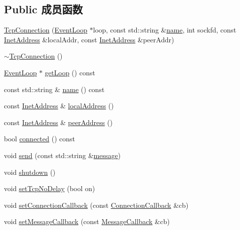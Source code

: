 \subsection*{Public 成员函数}
\begin{DoxyCompactItemize}
\item 
\hyperlink{classmuduo_1_1TcpConnection_a239881b2e3d5499da8745fba1bd82e08}{Tcp\+Connection} (\hyperlink{classmuduo_1_1EventLoop}{Event\+Loop} $\ast$loop, const std\+::string \&\hyperlink{classmuduo_1_1TcpConnection_ad8227ba86a01f26e4f173cd5e219d5d1}{name}, int sockfd, const \hyperlink{classmuduo_1_1InetAddress}{Inet\+Address} \&local\+Addr, const \hyperlink{classmuduo_1_1InetAddress}{Inet\+Address} \&peer\+Addr)
\item 
\hyperlink{classmuduo_1_1TcpConnection_a0a3551d2f9a37ccec8f9cb913e73878a}{$\sim$\+Tcp\+Connection} ()
\item 
\hyperlink{classmuduo_1_1EventLoop}{Event\+Loop} $\ast$ \hyperlink{classmuduo_1_1TcpConnection_aef1cbfe0592e8196e6c81b4db82a39ce}{get\+Loop} () const
\item 
const std\+::string \& \hyperlink{classmuduo_1_1TcpConnection_ad8227ba86a01f26e4f173cd5e219d5d1}{name} () const
\item 
const \hyperlink{classmuduo_1_1InetAddress}{Inet\+Address} \& \hyperlink{classmuduo_1_1TcpConnection_a607d0ab4bcee1d11f7de70501abdcc4b}{local\+Address} ()
\item 
const \hyperlink{classmuduo_1_1InetAddress}{Inet\+Address} \& \hyperlink{classmuduo_1_1TcpConnection_a3441a3efe8170b4b9892f0ca65d21726}{peer\+Address} ()
\item 
bool \hyperlink{classmuduo_1_1TcpConnection_aa0fd96bc25e3d509fb54028c2e4b91f6}{connected} () const
\item 
void \hyperlink{classmuduo_1_1TcpConnection_a4d274fdc2a242187da42dcd82cd593ec}{send} (const std\+::string \&\hyperlink{test13_8cc_a36bd74109f547f7f8198faf5a12d2879}{message})
\item 
void \hyperlink{classmuduo_1_1TcpConnection_a7861ee1569802186a619778efc85af13}{shutdown} ()
\item 
void \hyperlink{classmuduo_1_1TcpConnection_a7419d5072b837a2ba3cc5aac85015212}{set\+Tcp\+No\+Delay} (bool on)
\item 
void \hyperlink{classmuduo_1_1TcpConnection_abbb0008856a8495adb08c8cb7fe65c2c}{set\+Connection\+Callback} (const \hyperlink{namespacemuduo_ac7f7b0c9c9e96123dfea3fe120a2c404}{Connection\+Callback} \&cb)
\item 
void \hyperlink{classmuduo_1_1TcpConnection_a0a67f11f92b4cdc6f6c66b861f81cb08}{set\+Message\+Callback} (const \hyperlink{namespacemuduo_ab8a96fa483cffe150618e01058e6fc1b}{Message\+Callback} \&cb)

\end{DoxyCompactItemize}
